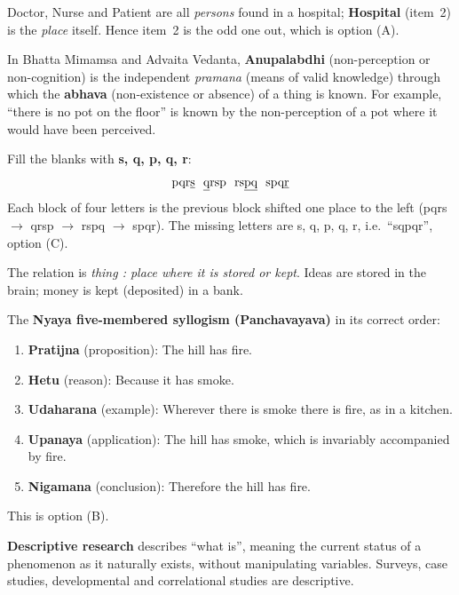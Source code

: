 Doctor, Nurse and Patient are all \emph{persons} found in a hospital; \textbf{Hospital} (item~2) is the \emph{place} itself. Hence item~2 is the odd one out, which is option (A).

In Bhatta Mimamsa and Advaita Vedanta, \textbf{Anupalabdhi} (non-perception or non-cognition) is the independent \emph{pramana} (means of valid knowledge) through which the \textbf{abhava} (non-existence or absence) of a thing is known. For example, ``there is no pot on the floor'' is known by the non-perception of a pot where it would have been perceived.

Fill the blanks with \textbf{s, q, p, q, r}:
\[\text{pqr\underline{s}}\ \ \text{\underline{q}rsp}\ \ \text{rs\underline{p}\underline{q}}\ \ \text{spq\underline{r}}\]
Each block of four letters is the previous block shifted one place to the left (pqrs $\rightarrow$ qrsp $\rightarrow$ rspq $\rightarrow$ spqr). The missing letters are s, q, p, q, r, i.e.\ ``sqpqr'', option (C).

The relation is \emph{thing : place where it is stored or kept}. Ideas are stored in the brain; money is kept (deposited) in a bank.

The \textbf{Nyaya five-membered syllogism (Panchavayava)} in its correct order:
\begin{enumerate}
\item \textbf{Pratijna} (proposition): The hill has fire.
\item \textbf{Hetu} (reason): Because it has smoke.
\item \textbf{Udaharana} (example): Wherever there is smoke there is fire, as in a kitchen.
\item \textbf{Upanaya} (application): The hill has smoke, which is invariably accompanied by fire.
\item \textbf{Nigamana} (conclusion): Therefore the hill has fire.
\end{enumerate}
This is option (B).

\textbf{Descriptive research} describes ``what is'', meaning the current status of a phenomenon as it naturally exists, without manipulating variables. Surveys, case studies, developmental and correlational studies are descriptive.

